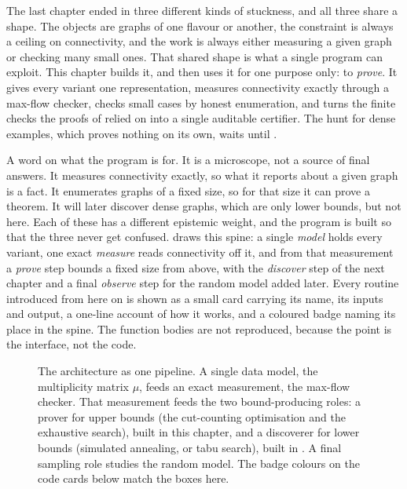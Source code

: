 The last chapter ended in three different kinds of stuckness, and all three share a shape. The objects are graphs of one flavour or another, the constraint is always a ceiling on connectivity, and the work is always either measuring a given graph or checking many small ones. That shared shape is what a single program can exploit. This chapter builds it, and then uses it for one purpose only: to \emph{prove}. It gives every variant one representation, measures connectivity exactly through a max-flow checker, checks small cases by honest enumeration, and turns the finite checks the proofs of  relied on into a single auditable certifier. The hunt for dense examples, which proves nothing on its own, waits until .

A word on what the program is for. It is a microscope, not a source of final answers. It measures connectivity exactly, so what it reports about a given graph is a fact. It enumerates graphs of a fixed size, so for that size it can prove a theorem. It will later discover dense graphs, which are only lower bounds, but not here. Each of these has a different epistemic weight, and the program is built so that the three never get confused.  draws this spine: a single \emph{model} holds every variant, one exact \emph{measure} reads connectivity off it, and from that measurement a \emph{prove} step bounds a fixed size from above, with the \emph{discover} step of the next chapter and a final \emph{observe} step for the random model added later. Every routine introduced from here on is shown as a small card carrying its name, its inputs and output, a one-line account of how it works, and a coloured badge naming its place in the spine. The function bodies are not reproduced, because the point is the interface, not the code.

\begin{figure}[ht]
\centering
\spinediagram
\caption{The architecture as one pipeline. A single data model, the multiplicity matrix $\mu$, feeds an exact measurement, the max-flow checker. That measurement feeds the two bound-producing roles: a prover for upper bounds (the cut-counting optimisation and the exhaustive search), built in this chapter, and a discoverer for lower bounds (simulated annealing, or tabu search), built in . A final sampling role studies the random model. The badge colours on the code cards below match the boxes here.}
\label{fig:spine}
\end{figure}

